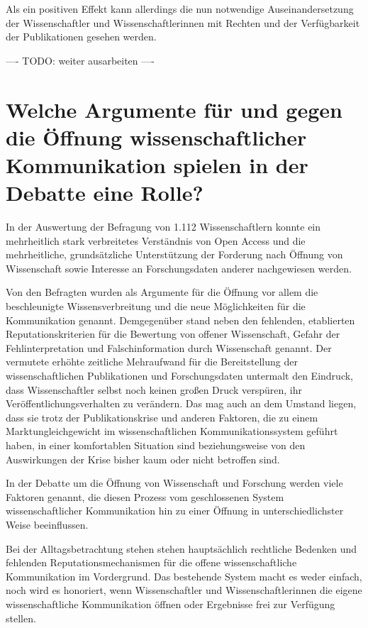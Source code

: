 Als ein positiven Effekt kann allerdings die nun notwendige Auseinandersetzung der Wissenschaftler und Wissenschaftlerinnen mit Rechten und der Verfügbarkeit der Publikationen gesehen werden.

---- TODO: weiter ausarbeiten ----


\section{Welche Argumente für und gegen die Öffnung wissenschaftlicher Kommunikation spielen in der Debatte eine Rolle?}

In der Auswertung der Befragung von 1.112 Wissenschaftlern konnte ein mehrheitlich stark verbreitetes Verständnis von Open Access und die mehrheitliche, grundsätzliche Unterstützung der Forderung nach Öffnung von Wissenschaft sowie Interesse an Forschungsdaten anderer nachgewiesen werden.

Von den Befragten wurden als Argumente für die Öffnung vor allem die beschleunigte Wissensverbreitung und die neue Möglichkeiten für die Kommunikation genannt. Demgegenüber stand neben den fehlenden, etablierten Reputationskriterien für die Bewertung von offener Wissenschaft, Gefahr der Fehlinterpretation und Falschinformation durch Wissenschaft genannt. Der vermutete erhöhte zeitliche Mehraufwand für die Bereitstellung der wissenschaftlichen Publikationen und Forschungsdaten untermalt den Eindruck, dass Wissenschaftler selbst noch keinen großen Druck verspüren, ihr Veröffentlichungsverhalten zu verändern. Das mag auch an dem Umstand liegen, dass sie trotz der Publikationskrise und anderen Faktoren, die zu einem Marktungleichgewicht im wissenschaftlichen Kommunikationssystem geführt haben, in einer komfortablen Situation sind beziehungsweise von den Auswirkungen der Krise bisher kaum oder nicht betroffen sind.

In der Debatte um die Öffnung von Wissenschaft und Forschung werden viele Faktoren genannt, die diesen Prozess vom geschlossenen System wissenschaftlicher Kommunikation hin zu einer Öffnung in unterschiedlichster Weise beeinflussen.

Bei der Alltagsbetrachtung stehen stehen hauptsächlich rechtliche Bedenken und fehlenden Reputationsmechanismen für die offene wissenschaftliche Kommunikation im Vordergrund. Das bestehende System macht es weder einfach, noch wird es honoriert, wenn Wissenschaftler und Wissenschaftlerinnen die eigene wissenschaftliche Kommunikation öffnen oder Ergebnisse frei zur Verfügung stellen.

